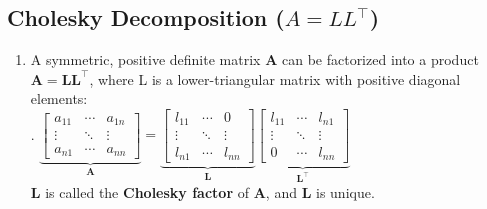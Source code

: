 \subsection{Cholesky Decomposition ($A=LL^\top$)}

\begin{enumerate}
    \item 
    \begin{theorem}
        A symmetric, positive definite matrix $\bm{A}$ can be factorized into a product $\bm{A} = \bm{LL}^\top$, where L is a lower-triangular matrix with positive diagonal elements:
        \hfill \cite{mfml/book/mml/Deisenroth-Faisal-Ong}
        \\
        .\hfill
        $
            \underset
            {
                \displaystyle
                \bm{A}
            } 
            {\underbrace{
                \displaystyle
                \begin{bmatrix}
                    a_{11} & \cdots & a_{1n} \\
                    \vdots & \ddots & \vdots \\
                    a_{n1} & \cdots & a_{nn}
                \end{bmatrix}
            }}
            =
            \underset
            {
                \displaystyle
                \bm{L}
            } 
            {\underbrace{
                \displaystyle
                \begin{bmatrix}
                    l_{11} & \cdots & 0 \\
                    \vdots & \ddots & \vdots \\
                    l_{n1} & \cdots & l_{nn}
                \end{bmatrix}
            }}
            \underset
            {
                \displaystyle
                \bm{L}^\top
            } 
            {\underbrace{
                \displaystyle
                \begin{bmatrix}
                    l_{11} & \cdots & l_{n1} \\
                    \vdots & \ddots & \vdots \\
                    0 & \cdots & l_{nn}
                \end{bmatrix}
            }}
        $
        \hfill \cite{mfml/book/mml/Deisenroth-Faisal-Ong}
        \\
        $\bm{L}$ is called the \textbf{Cholesky factor} of $\bm{A}$, and $\bm{L}$ is unique.
        \hfill \cite{mfml/book/mml/Deisenroth-Faisal-Ong}
    \end{theorem}


\end{enumerate}
